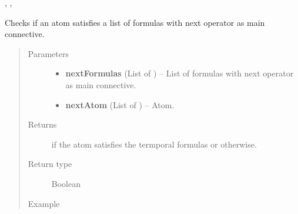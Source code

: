 \documentclass[letterpaper,10pt,english]{sphinxmanual}
\begin{document}
\begin{fulllineitems}


{\hyperref[closure:closure.getClosure]{}}, {\hyperref[formula:formula.Formula]{}}, {\hyperref[modelCheckingGraph:modelCheckingGraph.getAllAtoms]{}}



\end{fulllineitems}


\begin{fulllineitems}
\label{modelCheckingGraph:modelCheckingGraph.isNextState}
Checks if an atom satisfies a list of formulas with next operator as main connective.
\begin{quote}\begin{description}
\item[{Parameters}] \leavevmode\begin{itemize}
\item {} 
\textbf{nextFormulas} (List of {\hyperref[formula:formula.Formula]{}}) -- List of formulas with next operator as main connective.

\item {} 
\textbf{nextAtom} (List of {\hyperref[formula:formula.Formula]{}}) -- Atom.

\end{itemize}

\item[{Returns}] \leavevmode
{} if the atom satisfies the termporal formulas or  otherwise.

\item[{Return type}] \leavevmode
Boolean

\item[{Example }] \leavevmode
\end{description}\end{quote}


\end{fulllineitems}
\end{document}

